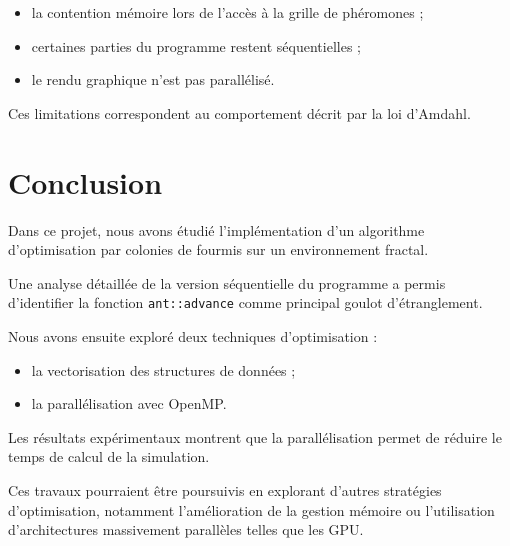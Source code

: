 \documentclass[11pt]{article}
\begin{document}
\begin{itemize}

\item la contention mémoire lors de l'accès à la grille de phéromones ;
\item certaines parties du programme restent séquentielles ;
\item le rendu graphique n'est pas parallélisé.
\end{itemize}

Ces limitations correspondent au comportement décrit par la loi d'Amdahl.

\section{Conclusion}

Dans ce projet, nous avons étudié l'implémentation d'un algorithme d'optimisation par colonies de fourmis sur un environnement fractal.

Une analyse détaillée de la version séquentielle du programme a permis d'identifier la fonction \texttt{ant::advance} comme principal goulot d'étranglement.

Nous avons ensuite exploré deux techniques d'optimisation :

\begin{itemize}

\item la vectorisation des structures de données ;
\item la parallélisation avec OpenMP.
\end{itemize}

Les résultats expérimentaux montrent que la parallélisation permet de réduire le temps de calcul de la simulation.

Ces travaux pourraient être poursuivis en explorant d'autres stratégies d'optimisation, notamment l'amélioration de la gestion mémoire ou l'utilisation d'architectures massivement parallèles telles que les GPU.
\end{document}

